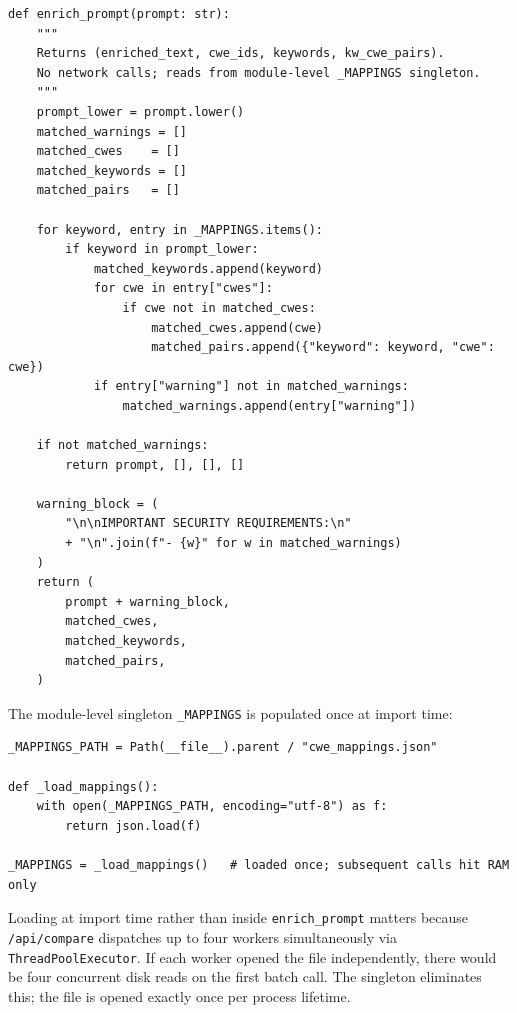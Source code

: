 \documentclass[12pt,a4paper]{report}
\begin{document}
\begin{lstlisting}[caption={Complete \texttt{enrich\_prompt} function from
                   \texttt{engine\_a\_enrich.py}}, label={lst:enrichprompt}]
def enrich_prompt(prompt: str):
    """
    Returns (enriched_text, cwe_ids, keywords, kw_cwe_pairs).
    No network calls; reads from module-level _MAPPINGS singleton.
    """
    prompt_lower = prompt.lower()
    matched_warnings = []
    matched_cwes    = []
    matched_keywords = []
    matched_pairs   = []

    for keyword, entry in _MAPPINGS.items():
        if keyword in prompt_lower:
            matched_keywords.append(keyword)
            for cwe in entry["cwes"]:
                if cwe not in matched_cwes:
                    matched_cwes.append(cwe)
                    matched_pairs.append({"keyword": keyword, "cwe": cwe})
            if entry["warning"] not in matched_warnings:
                matched_warnings.append(entry["warning"])

    if not matched_warnings:
        return prompt, [], [], []

    warning_block = (
        "\n\nIMPORTANT SECURITY REQUIREMENTS:\n"
        + "\n".join(f"- {w}" for w in matched_warnings)
    )
    return (
        prompt + warning_block,
        matched_cwes,
        matched_keywords,
        matched_pairs,
    )
\end{lstlisting}

The module-level singleton \texttt{\_MAPPINGS} is populated once at import time:

\begin{lstlisting}[caption={Singleton load in \texttt{engine\_a\_enrich.py}},
                   label={lst:singleton}]
_MAPPINGS_PATH = Path(__file__).parent / "cwe_mappings.json"

def _load_mappings():
    with open(_MAPPINGS_PATH, encoding="utf-8") as f:
        return json.load(f)

_MAPPINGS = _load_mappings()   # loaded once; subsequent calls hit RAM only
\end{lstlisting}

Loading at import time rather than inside \texttt{enrich\_prompt} matters
because \texttt{/api/compare} dispatches up to four workers simultaneously via
\texttt{ThreadPoolExecutor}. If each worker opened the file independently,
there would be four concurrent disk reads on the first batch call. The singleton
eliminates this; the file is opened exactly once per process lifetime.
\end{document}

